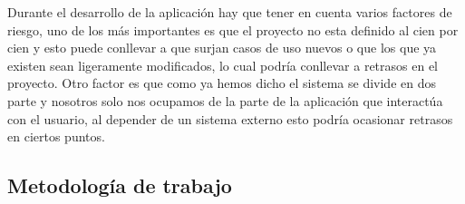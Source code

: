Durante el desarrollo de la aplicación hay que tener en cuenta varios factores de riesgo, uno de los más importantes es que el proyecto no esta definido al cien por cien y esto puede conllevar a que surjan casos de uso nuevos o que los que ya existen sean ligeramente modificados, lo cual podría conllevar a retrasos en el proyecto. Otro factor es que como ya hemos dicho el sistema se divide en dos parte y nosotros solo nos ocupamos de la parte de la aplicación que interactúa con el usuario, al depender de un sistema externo esto podría ocasionar retrasos en ciertos puntos.

\subsection{Metodología de trabajo}

